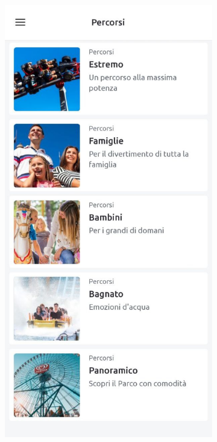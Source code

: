 \begin{figure}[H]
	\centering
	\begin{subfigure}[b]{0.35\textwidth}
		\centering
		\includegraphics[width=\textwidth]{img/miraPlan}

\end{subfigure}
\end{figure}

